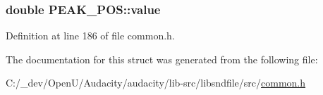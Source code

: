 \subsubsection[{\texorpdfstring{value}{value}}]{\setlength{\rightskip}{0pt plus 5cm}double P\+E\+A\+K\+\_\+\+P\+O\+S\+::value}\hypertarget{struct_p_e_a_k___p_o_s_aa7d1d61bf8e210b4bf782c5aba0be3a1}{}\label{struct_p_e_a_k___p_o_s_aa7d1d61bf8e210b4bf782c5aba0be3a1}


Definition at line 186 of file common.\+h.



The documentation for this struct was generated from the following file\+:\begin{DoxyCompactItemize}
\item 
C\+:/\+\_\+dev/\+Open\+U/\+Audacity/audacity/lib-\/src/libsndfile/src/\hyperlink{libsndfile_2src_2common_8h}{common.\+h}\end{DoxyCompactItemize}
